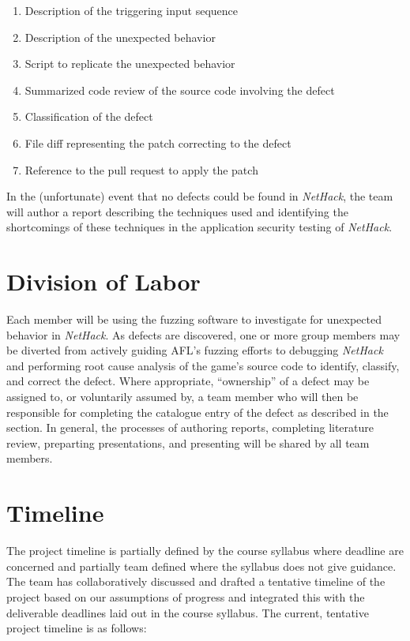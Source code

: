 \documentclass[12pt]{diazessay}
\begin{document}
\begin{enumerate}

  \item Description of the triggering input sequence
  \item Description of the unexpected behavior
  \item Script to replicate the unexpected behavior
  \item Summarized code review of the source code involving the defect
  \item Classification of the defect
  \item File diff representing the patch correcting to the defect
  \item Reference to the pull request to apply the patch

\end{enumerate}

In the (unfortunate) event that no defects could be found in \emph{NetHack}, the team will author a report describing the techniques used and identifying the shortcomings of these techniques in the application security testing of \emph{NetHack}.


\section*{Division of Labor}

Each member will be using the fuzzing software to investigate for unexpected behavior in \emph{NetHack}.
As defects are discovered, one or more group members may be diverted from actively guiding AFL's fuzzing efforts to debugging \emph{NetHack} and performing root cause analysis of the game's source code to identify, classify, and correct the defect.
Where appropriate, ``ownership'' of a defect may be assigned to, or voluntarily assumed by, a team member who will then be responsible for completing the catalogue entry of the defect as described in the  section.
In general, the processes of authoring reports, completing literature review, preparting presentations, and presenting will be shared by all team members.


\section*{Timeline}

The project timeline is partially defined by the course syllabus where deadline are concerned and partially team defined where the syllabus does not give guidance.
The team has collaboratively discussed and drafted a tentative timeline of the project based on our assumptions of progress and integrated this with the deliverable deadlines laid out in the course syllabus. The current, tentative project timeline is as follows:
\end{document}
